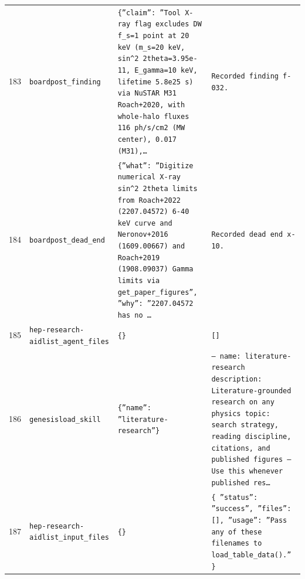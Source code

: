 \documentclass[11pt,a4paper]{article}
\begin{document}
\begin{longtable}{@{}p{}p{}p{}p{}@{}}
183 & \texttt{board}\newline\texttt{post\_\allowbreak{}finding} & \texttt{\{''claim'':\allowbreak{} ''Tool X-ray flag excludes DW f\_\allowbreak{}s=\allowbreak{}1 point at 20 keV (m\_\allowbreak{}s=\allowbreak{}20 keV,\allowbreak{} sin\textasciicircum{}\allowbreak{}2 2theta=\allowbreak{}3.95e-11,\allowbreak{} E\_\allowbreak{}gamma=\allowbreak{}10 keV,\allowbreak{} lifetime 5.8e25 s)\allowbreak{} via NuSTAR M31 Roach+2020,\allowbreak{} with whole-halo fluxes 116 ph/\allowbreak{}s/\allowbreak{}cm2 (MW center)\allowbreak{},\allowbreak{} 0.017 (M31)\allowbreak{},\allowbreak{}\ldots{}\allowbreak{}} & \texttt{Recorded finding f-032.} \\
184 & \texttt{board}\newline\texttt{post\_\allowbreak{}dead\_\allowbreak{}end} & \texttt{\{''what'':\allowbreak{} ''Digitize numerical X-ray sin\textasciicircum{}\allowbreak{}2 2theta limits from Roach+2022 (2207.04572)\allowbreak{} 6-40 keV curve and Neronov+2016 (1609.00667)\allowbreak{} and Roach+2019 (1908.09037)\allowbreak{} Gamma limits via get\_\allowbreak{}paper\_\allowbreak{}figures'',\allowbreak{} ''why'':\allowbreak{} ''2207.04572 has no \ldots{}\allowbreak{}} & \texttt{Recorded dead end x-10.} \\
185 & \texttt{hep-research-aid}\newline\texttt{list\_\allowbreak{}agent\_\allowbreak{}files} & \texttt{\{\}\allowbreak{}} & \texttt{[]\allowbreak{}} \\
186 & \texttt{genesis}\newline\texttt{load\_\allowbreak{}skill} & \texttt{\{''name'':\allowbreak{} ''literature-research''\}\allowbreak{}} & \texttt{--- name:\allowbreak{} literature-research description:\allowbreak{} Literature-grounded research on any physics topic:\allowbreak{} search strategy,\allowbreak{} reading discipline,\allowbreak{} citations,\allowbreak{} and published figures ---  Use this whenever published res\ldots{}\allowbreak{}} \\
187 & \texttt{hep-research-aid}\newline\texttt{list\_\allowbreak{}input\_\allowbreak{}files} & \texttt{\{\}\allowbreak{}} & \texttt{\{   ''status'':\allowbreak{} ''success'',\allowbreak{}   ''files'':\allowbreak{} []\allowbreak{},\allowbreak{}   ''usage'':\allowbreak{} ''Pass any of these filenames to load\_\allowbreak{}table\_\allowbreak{}data()\allowbreak{}.'' \}\allowbreak{}} \\

\end{longtable}
\end{document}
